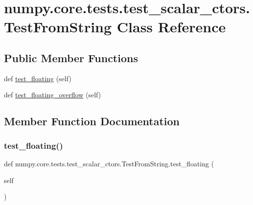 \hypertarget{classnumpy_1_1core_1_1tests_1_1test__scalar__ctors_1_1TestFromString}{}\section{numpy.\+core.\+tests.\+test\+\_\+scalar\+\_\+ctors.\+Test\+From\+String Class Reference}
\label{classnumpy_1_1core_1_1tests_1_1test__scalar__ctors_1_1TestFromString}
\subsection*{Public Member Functions}
\begin{DoxyCompactItemize}
\item 
def \hyperlink{classnumpy_1_1core_1_1tests_1_1test__scalar__ctors_1_1TestFromString_a8c7770663aedfba172405e4958dcd52b}{test\+\_\+floating} (self)
\item 
def \hyperlink{classnumpy_1_1core_1_1tests_1_1test__scalar__ctors_1_1TestFromString_a9cfe61adf73f2d0bd89c8dc5f4db808e}{test\+\_\+floating\+\_\+overflow} (self)
\end{DoxyCompactItemize}


\subsection{Member Function Documentation}
\mbox{\label{classnumpy_1_1core_1_1tests_1_1test__scalar__ctors_1_1TestFromString_a8c7770663aedfba172405e4958dcd52b}} 
\subsubsection{\texorpdfstring{test\+\_\+floating()}{test\_floating()}}
{\footnotesize\ttfamily def numpy.\+core.\+tests.\+test\+\_\+scalar\+\_\+ctors.\+Test\+From\+String.\+test\+\_\+floating (\begin{DoxyParamCaption}\item[{}]{self }\end{DoxyParamCaption})}


